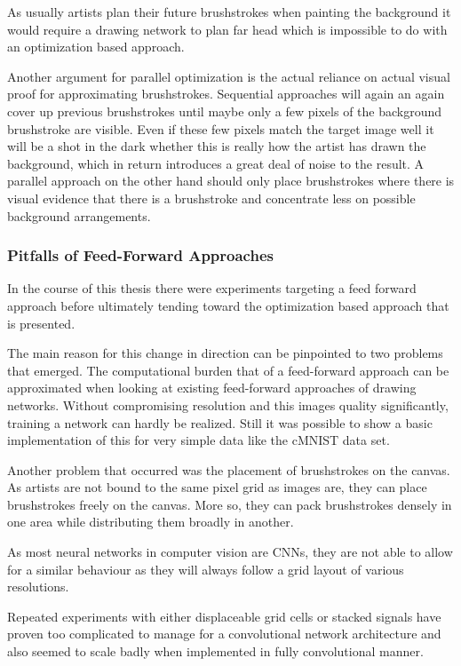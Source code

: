 As usually artists plan their future brushstrokes when painting the background it would require a drawing network to plan far head which is impossible to do with an optimization based approach.

Another argument for parallel optimization is the actual reliance on actual visual proof for approximating brushstrokes.
Sequential approaches will again an again cover up previous brushstrokes until maybe only a few pixels of the background brushstroke are visible.
Even if these few pixels match the target image well it will be a shot in the dark whether this is really how the artist has drawn the background, which in return introduces a great deal of noise to the result.
A parallel approach on the other hand should only place brushstrokes where there is visual evidence that there is a brushstroke and concentrate less on possible background arrangements.

\subsubsection{Pitfalls of Feed-Forward Approaches}

In the course of this thesis there were experiments targeting a feed forward approach before ultimately tending toward the optimization based approach that is presented.

The main reason for this change in direction can be pinpointed to two problems that emerged.
The computational burden that of a feed-forward approach can be approximated when looking at existing feed-forward approaches of drawing networks.
Without compromising resolution and this images quality significantly, training a network can hardly be realized.
Still it was possible to show a basic implementation of this for very simple data like the cMNIST data set.  

Another problem that occurred was the placement of brushstrokes on the canvas.
As artists are not bound to the same pixel grid as images are, they can place brushstrokes freely on the canvas.
More so, they can pack brushstrokes densely in one area while distributing them broadly in another.

As most neural networks in computer vision are CNNs, they are not able to allow for a similar behaviour as they will always follow a grid layout of various resolutions.

Repeated experiments with either displaceable grid cells or stacked signals have proven too complicated to manage for a convolutional network architecture and also seemed to scale badly when implemented in fully convolutional manner.

